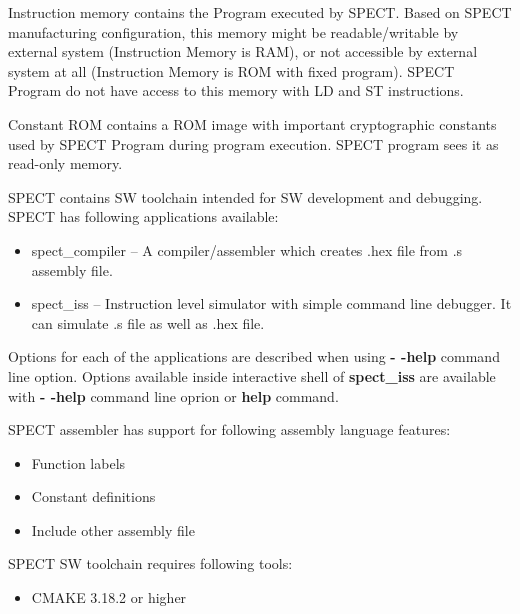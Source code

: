 \documentclass{tropic_design_spec}
\begin{document}

Instruction memory contains the Program executed by SPECT. Based on SPECT
manufacturing configuration, this memory might be readable/writable by external
system (Instruction Memory is RAM), or not accessible by external system at all
(Instruction Memory is ROM with fixed program). SPECT Program do not have access
to this memory with LD and ST instructions. 


Constant ROM contains a ROM image with important cryptographic constants
used by SPECT Program during program execution. SPECT program sees it as
read-only memory.



SPECT contains SW toolchain intended for SW development and debugging. SPECT
has following applications available:

\begin{itemize}
    \item{spect_compiler} -- A compiler/assembler which creates .hex file from .s
                            assembly file.
    \item{spect_iss} -- Instruction level simulator with simple command line debugger.
                       It can simulate .s file as well as .hex file.
\end{itemize}

Options for each of the applications are described when using \textbf{- -help}
command line option. Options available inside interactive shell of
\textbf{spect_iss} are available with \textbf{- -help} command line oprion or \textbf{help}
command.

SPECT assembler has support for following assembly language features:
\begin{itemize}
    \item{Function labels}
    \item{Constant definitions}
    \item{Include other assembly file}
\end{itemize}


SPECT SW toolchain requires following tools:
\begin{itemize}
    \item CMAKE 3.18.2 or higher
\end{itemize}
\end{document}
